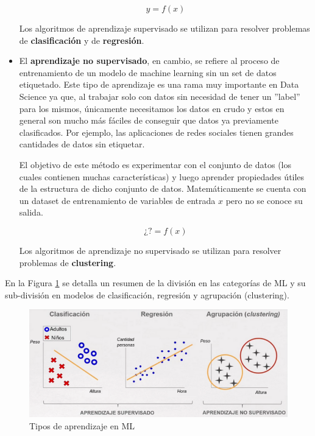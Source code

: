 \documentclass[12pt,a4paper]{article}
\begin{document}
\begin{sloppypar}
\begin{itemize}
$$y=f(x)$$

Los algoritmos de aprendizaje supervisado se utilizan para resolver problemas de \textbf{clasificación} y de \textbf{regresión}.

\item El \textbf{aprendizaje no supervisado}, en cambio, se refiere al proceso de entrenamiento de un modelo de machine learning sin un set de datos etiquetado. Este tipo de aprendizaje es una rama muy importante en Data Science ya que, al trabajar solo con datos sin necesidad de tener un ”label” para los mismos, únicamente necesitamos los datos en crudo y estos en general son mucho más fáciles de conseguir que datos ya previamente clasificados. Por ejemplo, las aplicaciones de redes sociales tienen grandes cantidades de datos sin etiquetar.  

El objetivo de este método es experimentar con el conjunto de datos (los cuales contienen muchas características) y luego aprender propiedades útiles de la estructura de dicho conjunto de datos. Matemáticamente se cuenta con un dataset de entrenamiento de variables de entrada $x$ pero no se conoce su salida. 

$$\mbox{¿}?=f(x)$$

Los algoritmos de aprendizaje no supervisado se utilizan para resolver problemas de \textbf{clustering}.
\end{itemize}

\cleardoublepage
En la Figura \ref{fig:Clasif_algoritmos} se detalla un resumen de la división en las categorías de ML y su sub-división en modelos de clasificación, regresión y agrupación (clustering). 

\begin{figure}[H]    %
  \centering
  \includegraphics[width=1\textwidth]{images/Clasificacion_algoritmos.png}
  \caption[Tipos de aprendizaje en ML]{Tipos de aprendizaje en ML\protect\footnotemark}  
  \label{fig:Clasif_algoritmos}
\end{figure}


\end{sloppypar}
\end{document}
